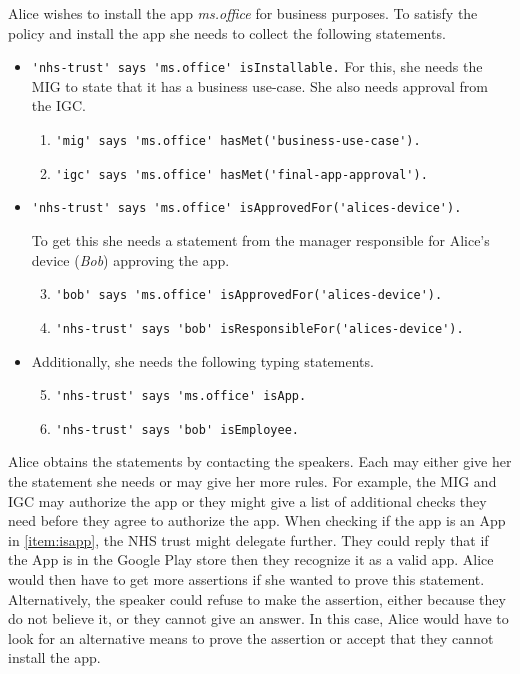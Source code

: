 \documentclass[thesis.tex]{subfiles}
\begin{document}
Alice wishes to install the app \emph{\ttfamily ms.office} for business purposes.
To satisfy the policy and install the app she needs to collect the following statements.

\medskip
\begin{itemize}
  \item \lstinline!'nhs-trust' says 'ms.office' isInstallable.!
    For this, she needs the \ac{MIG} to state that it has a business use-case.
    She also needs approval from the \ac{IGC}.
    \begin{enumerate}\setcounter{enumi}{0}
      \item \lstinline!'mig' says 'ms.office' hasMet('business-use-case').!
      \item \lstinline!'igc' says 'ms.office' hasMet('final-app-approval').!
    \end{enumerate}
  \item \lstinline!'nhs-trust' says 'ms.office' isApprovedFor('alices-device').!

    To get this she needs a statement from the manager responsible for Alice's device (\emph{Bob}) approving the app.
    \begin{enumerate}\setcounter{enumi}{2}
      \item \lstinline!'bob' says 'ms.office' isApprovedFor('alices-device').!
      \item \lstinline!'nhs-trust' says 'bob' isResponsibleFor('alices-device').!
    \end{enumerate}
  \item Additionally, she needs the following typing statements.
    \begin{enumerate}\setcounter{enumi}{4}
      \item \lstinline!'nhs-trust' says 'ms.office' isApp.! \label{item:isapp}
      \item \lstinline!'nhs-trust' says 'bob' isEmployee.!
    \end{enumerate}
\end{itemize}
%
Alice obtains the statements by contacting the speakers. Each may either give
her the statement she needs or may give her more rules. For example, the
\ac{MIG} and \ac{IGC} may authorize the app or they might give a list of
additional checks they need before they agree to authorize the app. When
checking if the app is an App in \autoref{item:isapp}, the NHS trust might
delegate further. They could reply that if the App is in the Google Play store
then they recognize it as a valid app. Alice would then have to get more
assertions if she wanted to prove this statement. Alternatively, the speaker
could refuse to make the assertion, either because they do not believe it, or
they cannot give an answer. In this case, Alice would have to look for an
alternative means to prove the assertion or accept that they cannot install the
app.
\end{document}
